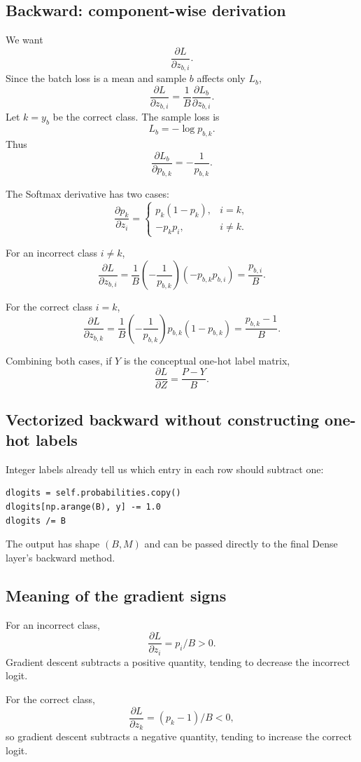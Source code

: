 \documentclass[11pt,a4paper]{article}
\newcommand{\pd}[2]{\frac{\partial #1}{\partial #2}}
\begin{document}
\subsection{Backward: component-wise derivation}

We want
\[
\pd{L}{z_{b,i}}.
\]
Since the batch loss is a mean and sample $b$ affects only $L_b$,
\[
\pd{L}{z_{b,i}}
=
\frac{1}{B}\pd{L_b}{z_{b,i}}.
\]
Let $k=y_b$ be the correct class. The sample loss is
\[
L_b=-\log p_{b,k}.
\]
Thus
\[
\pd{L_b}{p_{b,k}}=-\frac{1}{p_{b,k}}.
\]

The Softmax derivative has two cases:
\[
\pd{p_k}{z_i}
=
\begin{cases}
p_k(1-p_k),&i=k,\\-p_kp_i,&i\ne k.
\end{cases}
\]

For an incorrect class $i\ne k$,
\[
\pd{L}{z_{b,i}}
=
\frac{1}{B}
\left(-\frac{1}{p_{b,k}}\right)
(-p_{b,k}p_{b,i})
=
\boxed{\frac{p_{b,i}}{B}}.
\]

For the correct class $i=k$,
\[
\pd{L}{z_{b,k}}
=
\frac{1}{B}
\left(-\frac{1}{p_{b,k}}\right)
p_{b,k}(1-p_{b,k})
=
\boxed{\frac{p_{b,k}-1}{B}}.
\]

Combining both cases, if $Y$ is the conceptual one-hot label matrix,
\[
\boxed{
\pd{L}{Z}=\frac{P-Y}{B}
}.
\]

\subsection{Vectorized backward without constructing one-hot labels}

Integer labels already tell us which entry in each row should subtract one:
\begin{lstlisting}
dlogits = self.probabilities.copy()
dlogits[np.arange(B), y] -= 1.0
dlogits /= B
\end{lstlisting}

The output has shape $(B,M)$ and can be passed directly to the final Dense layer's backward method.

\subsection{Meaning of the gradient signs}

For an incorrect class,
\[
\pd{L}{z_i}=p_i/B>0.
\]
Gradient descent subtracts a positive quantity, tending to decrease the incorrect logit.

For the correct class,
\[
\pd{L}{z_k}=(p_k-1)/B<0,
\]
so gradient descent subtracts a negative quantity, tending to increase the correct logit.
\end{document}
